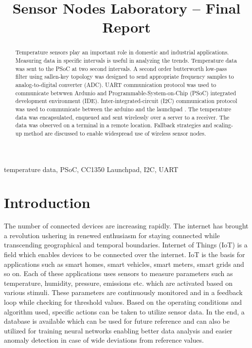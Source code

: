 \documentclass[conference]{IEEEtran}
\begin{document}
\title{Sensor Nodes Laboratory -- Final Report}

\author{
}

\maketitle

\begin{abstract}
Temperature sensors play an important role in domestic and industrial applications. Measuring data in specific intervals is useful in analyzing the trends. Temperature data was sent to the PSoC at two second intervals. A second order butterworth low-pass filter using sallen-key topology was designed to send appropriate frequency samples to analog-to-digital converter (ADC). UART communication protocol was used to communicate betwwen Ardunio and Programmable-System-on-Chip (PSoC) integrated development environment (IDE). Inter-integrated-circuit (I2C) communication protocol was used to communicate between the arduino and the launchpad . The temperature data was encapsulated, enqueued and sent wirelessly over a server to a receiver. The data was observed on a terminal in a remote location. Fallback strategies and scaling-up method are discussed to enable widespread use of wireless sensor nodes.
\end{abstract}

\begin{IEEEkeywords}
temperature data, PSoC, CC1350 Launchpad, I2C, UART
\end{IEEEkeywords}

\section{Introduction}
The number of connected devices are increasing rapidly. The internet has brought a revolution ushering in renewed enthusiasm for staying connected while transcending geographical and temporal boundaries. Internet of Things (IoT) is a field which enables devices to be connected over the internet. IoT is the basis for applications such as smart homes, smart vehicles, smart meters, smart grids and so on. Each of these applications uses sensors to measure parameters such as temperature, humidity, pressure, emissions etc. which are activated based on various stimuli. These parameters are continuously monitored and in a feedback loop while checking for threshold values. Based on the operating conditions and algorithm used, specific actions can be taken to utilize sensor data. In the end, a database is available which can be used for future reference and can also be utilized for training neural networks enabling better data analysis and easier anomaly detection in case of wide deviations from reference values.
\end{document}

